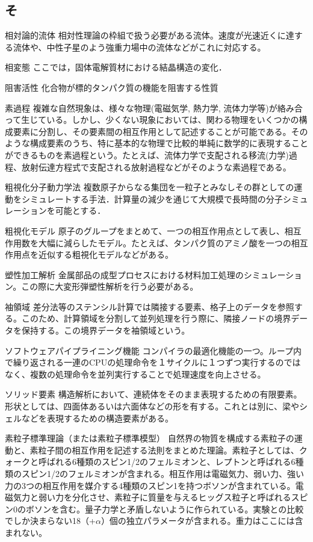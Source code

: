 \begin{用語集}
\section{そ}
\item{相対論的流体}{}
{相対性理論の枠組で扱う必要がある流体。速度が光速近くに達する流体や、中性子星のよう強重力場中の流体などがこれに対応する。}
\item{相変態}{}
{ここでは，固体電解質材における結晶構造の変化．}
\item{阻害活性}{}
{化合物が標的タンパク質の機能を阻害する性質}
\item{素過程}{}
{複雑な自然現象は、様々な物理(電磁気学, 熱力学, 流体力学等)が絡み合って生じている。しかし、少くない現象においては、関わる物理をいくつかの構成要素に分割し、その要素間の相互作用として記述することが可能である。そのような構成要素のうち、特に基本的な物理で比較的単純に数学的に表現することができるものを素過程という。たとえば、流体力学で支配される移流(力学)過程、放射伝達方程式で支配される放射過程などがそのような素過程である。}
\item{粗視化分子動力学法}{}
{複数原子からなる集団を一粒子とみなしその群としての運動をシミュレートする手法．計算量の減少を通じて大規模で長時間の分子シミュレーションを可能とする．}
\item{粗視化モデル}{}
{原子のグループをまとめて、一つの相互作用点として表し、相互作用数を大幅に減らしたモデル。たとえば、タンパク質のアミノ酸を一つの相互作用点を近似する粗視化モデルなどがある。}
\item{塑性加工解析}{}
{金属部品の成型プロセスにおける材料加工処理のシミュレーション。この際に大変形弾塑性解析を行う必要がある。}
\item{袖領域}{}
{差分法等のステンシル計算では隣接する要素、格子上のデータを参照する。このため、計算領域を分割して並列処理を行う際に、隣接ノードの境界データを保持する。この境界データを袖領域という。}
\item{ソフトウェアパイプライニング機能}{}
{コンパイラの最適化機能の一つ。ループ内で繰り返される一連のCPUの処理命令を１サイクルに１つずつ実行するのではなく、複数の処理命令を並列実行することで処理速度を向上させる。}
\item{ソリッド要素}{}
{構造解析において、連続体をそのまま表現するための有限要素。形状としては、四面体あるいは六面体などの形を有する。これとは別に、梁やシェルなどを表現するための構造要素がある。}
\item{素粒子標準理論（または素粒子標準模型）}{}
{自然界の物質を構成する素粒子の運動と、素粒子間の相互作用を記述する法則をまとめた理論。素粒子としては、クォークと呼ばれる6種類のスピン1/2のフェルミオンと、レプトンと呼ばれる6種類のスピン1/2のフェルミオンが含まれる。相互作用は電磁気力、弱い力、強い力の3つの相互作用を媒介する4種類のスピン1を持つボソンが含まれている。電磁気力と弱い力を分化させ、素粒子に質量を与えるヒッグス粒子と呼ばれるスピン0のボソンを含む。量子力学と矛盾しないように作られている。実験との比較でしか決まらない18（+$\alpha$）個の独立パラメータが含まれる。重力はここには含まれない。}

\end{用語集}
